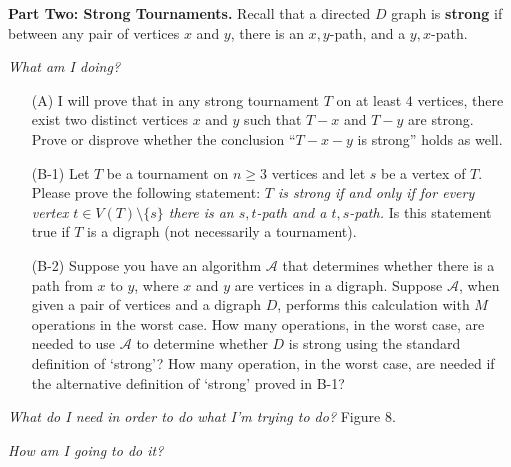 \documentclass[12pt]{article}
\begin{document}
\begin{enumerate}
\end{enumerate}

{\bf Part Two: Strong Tournaments.}  Recall that a directed $D$ graph is {\bf strong} 
if between any pair of vertices $x$ and $y$, there is an $x,y$-path, and a $y,x$-path.  \newline


\textit{What am I doing?}\newline
\begin{enumerate}
\item[(A)] I will prove that in any strong tournament $T$ on at least $4$ vertices, there exist two distinct vertices $x$ and $y$ 
such that $T-x$ and $T-y$ are strong.  Prove or disprove whether the conclusion ``$T - x - y$ is strong'' holds as well.
\item[(B-1)] Let $T$ be a tournament on $n \geq 3$ vertices and let $s$ be a vertex of $T$.  
Please prove the following statement: \emph{$T$ is strong if and only if for every vertex $t \in V(T) \setminus \{s\}$ there is an 
$s,t$-path and a $t,s$-path.}  Is this statement true if $T$ is a digraph (not necessarily a tournament).
\item[(B-2)] Suppose you have an algorithm $\mathcal{A}$ that determines whether there is a path from $x$ to $y$, where $x$ and $y$ are vertices in 
a digraph.  Suppose $\mathcal{A}$, when given a pair of vertices and a digraph $D$, performs this calculation with $M$ operations in the worst case. 
How many operations, in the worst case, are needed to use $\mathcal{A}$ to determine whether $D$ is strong using the standard definition of `strong'? 
How many operation, in the worst case, are needed if the alternative definition of `strong' proved in B-1?
\end{enumerate}

\textit{What do I need in order to do what I'm trying to do?}\newline
Figure 8.\newline
 
\textit{How am I going to do it?}\newline
\end{document}
